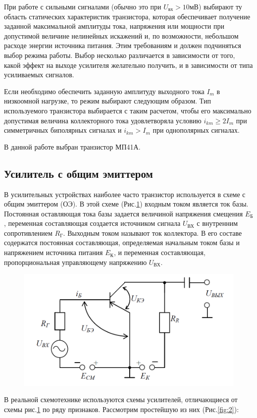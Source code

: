 При работе с сильными сигналами (обычно это при $U_{\text{вх}}>10$мВ) выбирают ту область статических характеристик транзистора, которая обеспечивает получение заданной максимальной амплитуды тока, напряжения или мощности при допустимой величине
нелинейных искажений и, по возможности, небольшом расходе энергии источника питания. Этим требованиям и должен подчиняться выбор режима работы. Выбор несколько различается в зависимости от того, какой эффект на выходе усилителя желательно получить, и в зависимости от типа усиливаемых сигналов.

Если необходимо обеспечить заданную амплитуду выходного тока $I_m$ в низкоомной нагрузке, то режим выбирают следующим образом. Тип используемого транзистора выбирается с таким расчетом, чтобы его максимально допустимая величина коллекторного тока удовлетворяла условию $i_{km}\geqslant 2I_m$ при симметричных биполярных сигналах и $i_{km}>I_m$ при однополярных сигналах.

В данной работе выбран транзистор МП41А.

\subsection{\textbf{Усилитель с общим эмиттером}}
В усилительных устройствах наиболее часто транзистор используется в схеме с общим эмиттером (ОЭ). В этой схеме (Рис.\ref{fig:1}) входным током является ток базы. Постоянная оставляющая тока базы задается величиной напряжения смещения $E_{\text{Б}}$, переменная составляющая создается источником сигнала $U_{\text{ВХ}}$ с внутренним сопротивлением $R_{\text{Г}}$. Выходным током называют ток коллектора. В его составе содержатся постоянная составляющая, определяемая начальным током базы и напряжением источника питания $E_{\text{К}}$, и переменная составляющая, пропорциональная управляющему напряжению $U_{\text{ВХ}}$.

\begin{figure}[h]
	\centering
	\includegraphics[width=0.5\linewidth]{fig/fig1}
	\caption{}
	\label{fig:1}
\end{figure}

 В реальной схемотехнике используются схемы усилителей, отличающиеся от схемы рис.\ref{fig:1} по ряду признаков. Рассмотрим простейшую из них (Рис.\ref{fig:2}):

